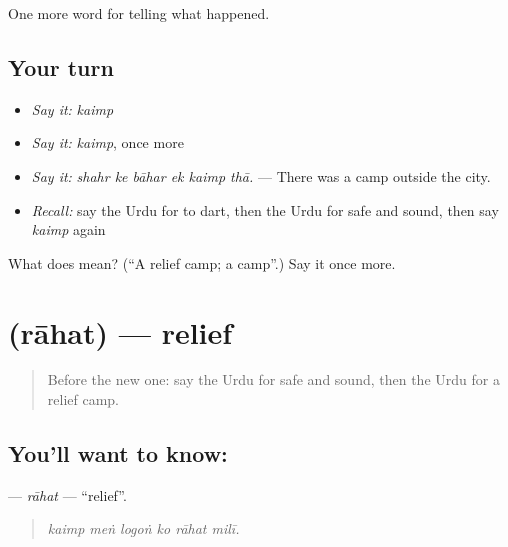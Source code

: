 \begin{grammarlens}[title={What you've built}]
One more word for telling what happened.
\end{grammarlens}

\subsection*{Your turn}
\begin{itemize}
\raggedright
  \item \emph{Say it:} \emph{kaimp}
  \item \emph{Say it:} \emph{kaimp}, once more
  \item \emph{Say it:} \emph{shahr ke bāhar ek kaimp thā.} — There was a camp outside the city.
  \item \emph{Recall:} say the Urdu for to dart, then the Urdu for safe and sound, then say \emph{kaimp} again
\end{itemize}

\begin{tcolorbox}[breakable,colback=teal!4,colframe=teal!35!black,title={Before you move on}]
What does  mean? (\textquotedblleft{}A relief camp; a camp\textquotedblright{}.) Say it once more.
\end{tcolorbox}
\section[\texorpdfstring{\ur{راحت} (rāhat)}{راحت (rāhat)}]{ (rāhat) — relief}

\label{lesson:UR-C297-rahat}



\begin{quote}
Before the new one: say the Urdu for safe and sound, then the Urdu for a relief camp.
\end{quote}

\subsection*{You'll want to know: }
\textbf{} — \emph{rāhat} — \textquotedblleft{}relief\textquotedblright{}.

\begin{quote}
     
\end{quote}

\begin{quote}
\emph{kaimp meṅ logoṅ ko rāhat milī.}
\end{quote}

